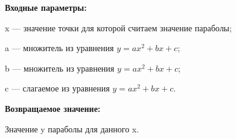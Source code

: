 \textbf{Входные параметры:}  
 
x --- значение точки для которой считаем значение параболы;
 
a --- множитель из уравнения $y=ax^2+bx+c$;
 
b --- множитель из уравнения $y=ax^2+bx+c$;
 
c --- слагаемое из уравнения $y=ax^2+bx+c$.

\textbf{Возвращаемое значение:}

Значение y параболы для данного x.